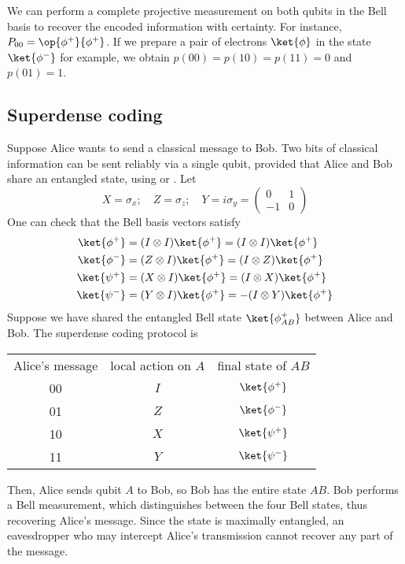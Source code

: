 We can perform a complete projective measurement on both qubits in the Bell basis to recover the encoded information with certainty.
For instance, $P_{00} = \op{\phi^+}{\phi^+}$.
If we prepare a pair of electrons $\ket{\phi}$ in the state $\ket{\phi^-}$ for example, we obtain $p(00) = p(10) = p(11) = 0$ and $p(01) = 1$.

\subsection{Superdense coding}
Suppose Alice wants to send a classical message to Bob.
Two bits of classical information can be sent reliably via a single qubit, provided that Alice and Bob share an entangled state, using  or .
Let
\[ X = \sigma_x;\quad Z = \sigma_z;\quad Y = i\sigma_y = \begin{pmatrix}
    0 & 1 \\
    -1 & 0
\end{pmatrix} \]
One can check that the Bell basis vectors satisfy
\begin{align*}
    \ket{\phi^+} &= (I \otimes I) \ket{\phi^+} = (I \otimes I) \ket{\phi^+}\\
    \ket{\phi^-} &= (Z \otimes I) \ket{\phi^+} = (I \otimes Z) \ket{\phi^+}\\
    \ket{\psi^+} &= (X \otimes I) \ket{\phi^+} = (I \otimes X) \ket{\phi^+}\\
    \ket{\psi^-} &= (Y \otimes I) \ket{\phi^+} = -(I \otimes Y) \ket{\phi^+}
\end{align*}
Suppose we have shared the entangled Bell state $\ket{\phi^+_{AB}}$ between Alice and Bob.
The superdense coding protocol is
\begin{center}
    \begin{tabular}{c c c}
        Alice's message & local action on $A$ & final state of $AB$ \\
        00 & $I$ & $\ket{\phi^+}$ \\
        01 & $Z$ & $\ket{\phi^-}$ \\
        10 & $X$ & $\ket{\psi^+}$ \\
        11 & $Y$ & $\ket{\psi^-}$
    \end{tabular}
\end{center}
Then, Alice sends qubit $A$ to Bob, so Bob has the entire state $AB$.
Bob performs a Bell measurement, which distinguishes between the four Bell states, thus recovering Alice's message.
Since the state is maximally entangled, an eavesdropper who may intercept Alice's transmission cannot recover any part of the message.

